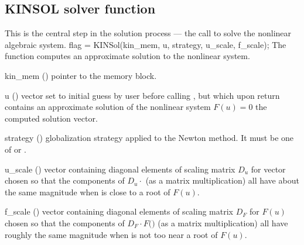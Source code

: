 \subsection{KINSOL solver function}\label{sss:kinsol}

This is the central step in the solution process --- the call to solve
the nonlinear algebraic system.
%
{
  flag = KINSol(kin\_mem, u, strategy, u\_scale, f\_scale);
}
{
  The function  computes an approximate solution to the nonlinear
  system.
}
{
  \begin{args}[strategy]
  \item[kin\_mem] ()
    pointer to the {\kinsol} memory block.
  \item[u] ()
    vector set to initial guess by user before calling ,
    but which upon return contains an approximate solution of
    the nonlinear system $F(u)=0$ the computed solution vector.
  \item[strategy] ()
    globalization strategy applied to the Newton method.
    It must be one of  or .
  \item[u\_scale] ()
    vector containing diagonal elements of scaling matrix $D_u$ for vector 
    chosen so that the components of $D_u \cdot$
    (as a matrix multiplication) all have about the same magnitude when 
     is close to a root of $F(u)$.
  \item[f\_scale] ()
    vector containing diagonal elements of scaling matrix $D_F$ for $F(u)$ chosen 
    so that the components of $D_F \cdot F($$)$ 
    (as a matrix multiplication) all have roughly the same magnitude when 
     is not too near a root of $F(u)$.
  \end{args}
}

